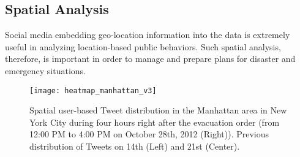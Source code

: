 \subsection{Spatial Analysis}
\label{sec:spatial_analysis}
%
Social media embedding geo-location information into the data is extremely useful in analyzing location-based public behaviors.
Such spatial analysis, therefore, is important in order to manage and prepare plans for disaster and emergency situations.

\begin{figure}[htb]
\centering
\texttt{[image: heatmap\_manhattan\_v3]}
\caption{Spatial user-based Tweet distribution in the Manhattan area in New York City during four hours right after the evacuation order (from 12:00 PM to 4:00 PM on October 28th, 2012 (Right)). Previous distribution of Tweets on 14th (Left) and 21st (Center).}
\label{fig:heatmap_manhattan}
\end{figure}

